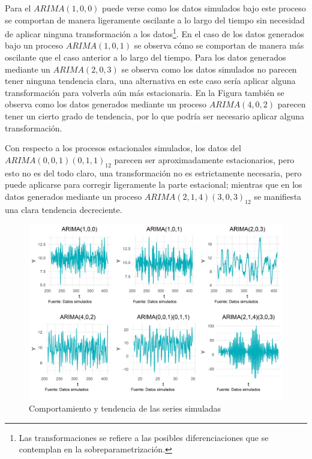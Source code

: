 \documentclass[
]{article}
\begin{document}
Para el \(ARIMA(1,0,0)\) puede verse como los datos simulados bajo este
proceso se comportan de manera ligeramente oscilante a lo largo del
tiempo sin necesidad de aplicar ninguna transformación a los
datos\footnote{Las transformaciones se refiere a las posibles
  diferenciaciones que se contemplan en la sobreparametrización.}. En el
caso de los datos generados bajo un proceso \(ARIMA(1,0,1)\) se observa
cómo se comportan de manera más oscilante que el caso anterior a lo
largo del tiempo. Para los datos generados mediante un \(ARIMA(2,0,3)\)
se observa como los datos simulados no parecen tener ninguna tendencia
clara, una alternativa en este caso sería aplicar alguna transformación
para volverla aún más estacionaria. En la Figura también se observa como
los datos generados mediante un proceso \(ARIMA(4,0,2)\) parecen tener
un cierto grado de tendencia, por lo que podría ser necesario aplicar
alguna transformación.

Con respecto a los procesos estacionales simulados, los datos del
\(ARIMA(0,0,1)(0,1,1)_{12}\) parecen ser aproximadamente estacionarios,
pero esto no es del todo claro, una transformación no es estrictamente
necesaria, pero puede aplicarse para corregir ligeramente la parte
estacional; mientras que en los datos generados mediante un proceso
\(ARIMA(2,1,4)(3,0,3)_{12}\) se manifiesta una clara tendencia
decreciente.

\begin{figure}[H]
\includegraphics[width=1\linewidth,height=1\textheight]{Tesis_files/figure-latex/series_simuladas-1} \caption{Comportamiento y tendencia de las series simuladas}\label{fig:series_simuladas}
\end{figure}
\end{document}

